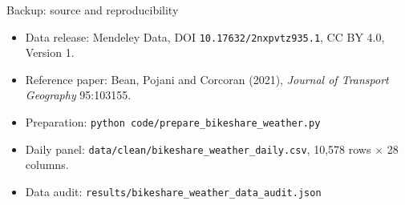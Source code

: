 \documentclass[aspectratio=169,11pt]{beamer}
\begin{document}
\begin{frame}{Backup: source and reproducibility}
  \footnotesize
  \begin{itemize}
    \setlength{\itemsep}{0.14cm}
    \item Data release: Mendeley Data, DOI \texttt{10.17632/2nxpvtz935.1},
      CC BY 4.0, Version 1.
    \item Reference paper: Bean, Pojani and Corcoran (2021),
      \emph{Journal of Transport Geography} 95:103155.
    \item Preparation: \texttt{python code/prepare\_bikeshare\_weather.py}
    \item Daily panel: \texttt{data/clean/bikeshare\_weather\_daily.csv},
      10{,}578 rows $\times$ 28 columns.
    \item Data audit: \texttt{results/bikeshare\_weather\_data\_audit.json}
  \end{itemize}
\end{frame}
\end{document}

